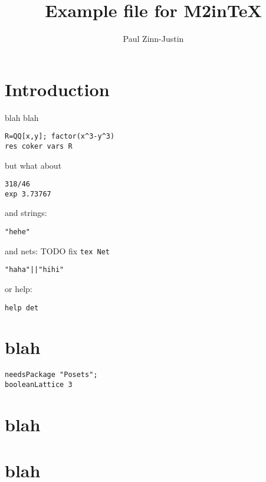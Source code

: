 \documentclass[12pt,a4paper]{amsart}
\title{Example file for M2inTeX}
\author{Paul Zinn-Justin}
\begin{document}
\maketitle

\section{Introduction}
blah blah
\begin{verbatim}
R=QQ[x,y]; factor(x^3-y^3)
res coker vars R
\end{verbatim}
but what about
\begin{verbatim}
318/46
exp 3.73767
\end{verbatim}
and strings:
\begin{verbatim}
"hehe"
\end{verbatim}
and nets: TODO fix {\tt tex Net}
\begin{verbatim}
"haha"||"hihi"
\end{verbatim}
or help:
\begin{verbatim}
help det
\end{verbatim}


\section{blah}
\begin{verbatim}
needsPackage "Posets";
booleanLattice 3
\end{verbatim}
\section{blah}
\section{blah}
\end{document}

